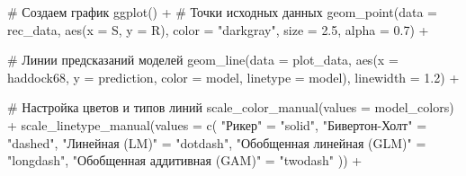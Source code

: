 \documentclass[
  letterpaper,
  DIV=11,
  numbers=noendperiod]{scrreprt}
\newenvironment{Shaded}{\begin{snugshade}}{\end{snugshade}}
\newcommand{\AttributeTok}[1]{\textcolor[rgb]{0.40,0.45,0.13}{#1}}
\newcommand{\CommentTok}[1]{\textcolor[rgb]{0.37,0.37,0.37}{#1}}
\newcommand{\FloatTok}[1]{\textcolor[rgb]{0.68,0.00,0.00}{#1}}
\newcommand{\FunctionTok}[1]{\textcolor[rgb]{0.28,0.35,0.67}{#1}}
\newcommand{\NormalTok}[1]{\textcolor[rgb]{0.00,0.23,0.31}{#1}}
\newcommand{\OtherTok}[1]{\textcolor[rgb]{0.00,0.23,0.31}{#1}}
\newcommand{\SpecialCharTok}[1]{\textcolor[rgb]{0.37,0.37,0.37}{#1}}
\newcommand{\StringTok}[1]{\textcolor[rgb]{0.13,0.47,0.30}{#1}}
\begin{document}
\begin{Shaded}
\begin{Highlighting}[]
\CommentTok{\# Создаем график}
\FunctionTok{ggplot}\NormalTok{() }\SpecialCharTok{+}
  \CommentTok{\# Точки исходных данных}
  \FunctionTok{geom\_point}\NormalTok{(}\AttributeTok{data =}\NormalTok{ rec\_data, }\FunctionTok{aes}\NormalTok{(}\AttributeTok{x =}\NormalTok{ S, }\AttributeTok{y =}\NormalTok{ R), }
             \AttributeTok{color =} \StringTok{"darkgray"}\NormalTok{, }\AttributeTok{size =} \FloatTok{2.5}\NormalTok{, }\AttributeTok{alpha =} \FloatTok{0.7}\NormalTok{) }\SpecialCharTok{+}
  
  \CommentTok{\# Линии предсказаний моделей}
  \FunctionTok{geom\_line}\NormalTok{(}\AttributeTok{data =}\NormalTok{ plot\_data, }
            \FunctionTok{aes}\NormalTok{(}\AttributeTok{x =}\NormalTok{ haddock68, }\AttributeTok{y =}\NormalTok{ prediction, }\AttributeTok{color =}\NormalTok{ model, }\AttributeTok{linetype =}\NormalTok{ model),}
            \AttributeTok{linewidth =} \FloatTok{1.2}\NormalTok{) }\SpecialCharTok{+}
  
  \CommentTok{\# Настройка цветов и типов линий}
  \FunctionTok{scale\_color\_manual}\NormalTok{(}\AttributeTok{values =}\NormalTok{ model\_colors) }\SpecialCharTok{+}
  \FunctionTok{scale\_linetype\_manual}\NormalTok{(}\AttributeTok{values =} \FunctionTok{c}\NormalTok{(}
    \StringTok{"Рикер"} \OtherTok{=} \StringTok{"solid"}\NormalTok{,}
    \StringTok{"Бивертон{-}Холт"} \OtherTok{=} \StringTok{"dashed"}\NormalTok{,}
    \StringTok{"Линейная (LM)"} \OtherTok{=} \StringTok{"dotdash"}\NormalTok{,}
    \StringTok{"Обобщенная линейная (GLM)"} \OtherTok{=} \StringTok{"longdash"}\NormalTok{,}
    \StringTok{"Обобщенная аддитивная (GAM)"} \OtherTok{=} \StringTok{"twodash"}
\NormalTok{  )) }\SpecialCharTok{+}
  

\end{Highlighting}
\end{Shaded}
\end{document}
